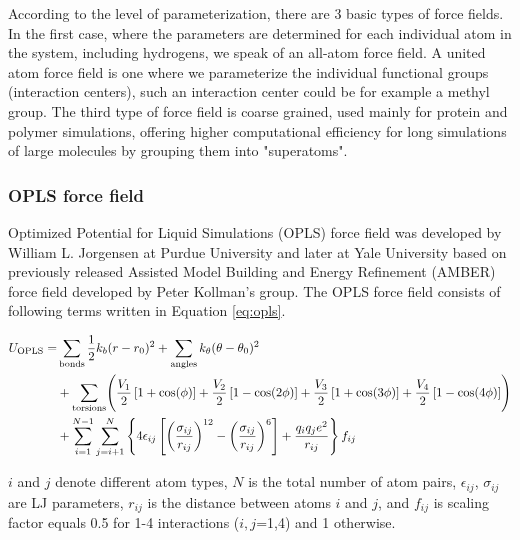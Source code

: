 According to the level of parameterization, there are 3 basic types of force fields. In the first case, where the parameters are determined for each individual atom in the system, including hydrogens, we speak of an all-atom force field. A united atom force field is one where we parameterize the individual functional groups (interaction centers), such an interaction center could be for example a methyl group. The third type of force field is coarse grained, used mainly for protein and polymer simulations, offering higher computational efficiency for long simulations of large molecules by grouping them into "superatoms". \cite{da_silva_are_2020}

\subsubsection{OPLS force field}

Optimized Potential for Liquid Simulations (OPLS) force field was developed by William L. Jorgensen \cite{jorgensen_opls_1988} at Purdue University and later at Yale University based on previously released Assisted Model Building and Energy Refinement (AMBER) force field developed by Peter Kollman's group. \cite{cornell_second_1995} The OPLS force field consists of following terms written in Equation \ref{eq:opls}. 
	
	\begin{equation}
		\begin{aligned}
			U_{\text{OPLS}} = & \sum_{\text{bonds}} \frac{1}{2} k_b(r-r_0)^2 + \sum_{\text{angles}} k_{\theta} (\theta-\theta_0)^2 \\
			& + \sum_{\text{torsions}} \Biggl( \frac {V_1} {2} \left [ 1 + \cos (\phi) \right ] + \frac {V_2} {2} \left [ 1 - \cos (2\phi) \right ] 
			+ \frac {V_3} {2} \left [ 1 + \cos (3\phi) \right ] + \frac {V_4} {2} \left [ 1 - \cos (4\phi) \right ] \Biggr) \\
			& + \sum_{i=1}^{N-1} \sum_{j=i+1}^N \left\lbrace 4\epsilon_{ij} \left[ \left( \frac{\sigma_{ij}}{r_{ij}} \right)^{12} - \left( \frac{\sigma_{ij}}{r_{ij}} \right)^6 \right] + \frac{q_iq_je^2}{r_{ij}} \right\rbrace f_{ij}
		\end{aligned}
		\label{eq:opls}
		\vspace{-0.4cm}
	\end{equation}
	
$i$ and $j$ denote different atom types, $N$ is the total number of atom pairs, $\epsilon_{ij}$, $\sigma_{ij}$ are LJ parameters, $r_{ij}$ is the distance between atoms $i$ and $j$, and $f_{ij}$ is scaling factor equals 0.5 for 1-4 interactions ($i,j$=1,4) and 1 otherwise.
	
